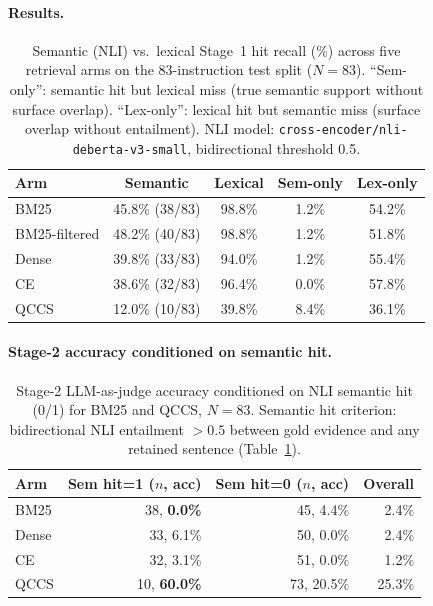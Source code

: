 \documentclass{article}
\begin{document}
\paragraph{Results.}

\begin{table}[H]
\centering
\caption{Semantic (NLI) vs.\ lexical Stage~1 hit recall (\%) across five
  retrieval arms on the 83-instruction test split ($N{=}83$). ``Sem-only'': semantic
  hit but lexical miss (true semantic support without surface overlap).
  ``Lex-only'': lexical hit but semantic miss (surface overlap without entailment).
  NLI model: \texttt{cross-encoder/nli-deberta-v3-small}, bidirectional threshold 0.5.}
\label{tab:nli}
\small
\begin{tabular}{@{}lcccc@{}}
\toprule
Arm & Semantic & Lexical & Sem-only & Lex-only \\
\midrule
BM25          & 45.8\% (38/83) & 98.8\% & 1.2\% & 54.2\% \\
BM25-filtered & 48.2\% (40/83) & 98.8\% & 1.2\% & 51.8\% \\
Dense         & 39.8\% (33/83) & 94.0\% & 1.2\% & 55.4\% \\
CE            & 38.6\% (32/83) & 96.4\% & 0.0\% & 57.8\% \\
QCCS          & 12.0\% (10/83) & 39.8\%  & 8.4\% & 36.1\% \\
\bottomrule
\end{tabular}
\end{table}

\paragraph{Stage-2 accuracy conditioned on semantic hit.}

\begin{table}[H]
\centering
\caption{Stage-2 LLM-as-judge accuracy conditioned on NLI semantic hit (0/1)
  for BM25 and QCCS, $N{=}83$. Semantic hit criterion: bidirectional NLI entailment
  $>0.5$ between gold evidence and any retained sentence
  (Table~\ref{tab:nli}).}
\label{tab:sem_condacc}
\small
\begin{tabular}{@{}lrrr@{}}
\toprule
Arm & Sem hit=1 ($n$, acc) & Sem hit=0 ($n$, acc) & Overall \\
\midrule
BM25  & 38, \textbf{0.0\%} & 45, 4.4\% & 2.4\% \\
Dense & 33, 6.1\% & 50, 0.0\% & 2.4\% \\
CE    & 32, 3.1\% & 51, 0.0\% & 1.2\% \\
QCCS  & 10, \textbf{60.0\%} & 73, 20.5\% & 25.3\% \\
\bottomrule
\end{tabular}
\end{table}
\end{document}
